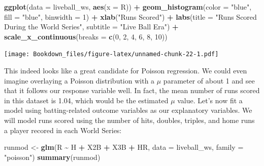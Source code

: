 \documentclass[
]{book}
\newenvironment{Shaded}{\begin{snugshade}}{\end{snugshade}}
\newcommand{\DataTypeTok}[1]{\textcolor[rgb]{0.13,0.29,0.53}{#1}}
\newcommand{\DecValTok}[1]{\textcolor[rgb]{0.00,0.00,0.81}{#1}}
\newcommand{\KeywordTok}[1]{\textcolor[rgb]{0.13,0.29,0.53}{\textbf{#1}}}
\newcommand{\NormalTok}[1]{#1}
\newcommand{\OperatorTok}[1]{\textcolor[rgb]{0.81,0.36,0.00}{\textbf{#1}}}
\newcommand{\StringTok}[1]{\textcolor[rgb]{0.31,0.60,0.02}{#1}}
\begin{document}
\begin{Shaded}
\begin{Highlighting}[]
\KeywordTok{ggplot}\NormalTok{(}\DataTypeTok{data =}\NormalTok{ liveball\_ws, }\KeywordTok{aes}\NormalTok{(}\DataTypeTok{x =}\NormalTok{ R)) }\OperatorTok{+}
\StringTok{  }\KeywordTok{geom\_histogram}\NormalTok{(}\DataTypeTok{color =} \StringTok{"blue"}\NormalTok{, }\DataTypeTok{fill =} \StringTok{"blue"}\NormalTok{, }\DataTypeTok{binwidth =} \DecValTok{1}\NormalTok{) }\OperatorTok{+}
\StringTok{  }\KeywordTok{xlab}\NormalTok{(}\StringTok{"Runs Scored"}\NormalTok{) }\OperatorTok{+}
\StringTok{  }\KeywordTok{labs}\NormalTok{(}\DataTypeTok{title =} \StringTok{"Runs Scored During the World Series"}\NormalTok{, }
       \DataTypeTok{subtitle =} \StringTok{"Live Ball Era"}\NormalTok{) }\OperatorTok{+}
\StringTok{  }\KeywordTok{scale\_x\_continuous}\NormalTok{(}\DataTypeTok{breaks =} \KeywordTok{c}\NormalTok{(}\DecValTok{0}\NormalTok{, }\DecValTok{2}\NormalTok{, }\DecValTok{4}\NormalTok{, }\DecValTok{6}\NormalTok{, }\DecValTok{8}\NormalTok{, }\DecValTok{10}\NormalTok{)) }
\end{Highlighting}
\end{Shaded}

\texttt{[image: Bookdown\_files/figure-latex/unnamed-chunk-22-1.pdf]}

This indeed looks like a great candidate for Poisson regression. We could even imagine overlaying a Poisson distribution with a \(\mu\) parameter of about 1 and see that it follows our response variable well. In fact, the mean number of runs scored in this dataset is 1.04, which would be the estimated \(\mu\) value. Let's now fit a model using batting-related outcome variables as our explanatory variables. We will model runs scored using the number of hits, doubles, triples, and home runs a player recored in each World Series:

\begin{Shaded}
\begin{Highlighting}[]
\NormalTok{runmod \textless{}{-}}\StringTok{ }\KeywordTok{glm}\NormalTok{(R }\OperatorTok{\textasciitilde{}}\StringTok{ }\NormalTok{H }\OperatorTok{+}\StringTok{ }\NormalTok{X2B }\OperatorTok{+}\StringTok{ }\NormalTok{X3B }\OperatorTok{+}\StringTok{ }\NormalTok{HR, }\DataTypeTok{data =}\NormalTok{ liveball\_ws, }\DataTypeTok{family =} \StringTok{"poisson"}\NormalTok{)}
\KeywordTok{summary}\NormalTok{(runmod)}
\end{Highlighting}
\end{Shaded}
\end{document}
